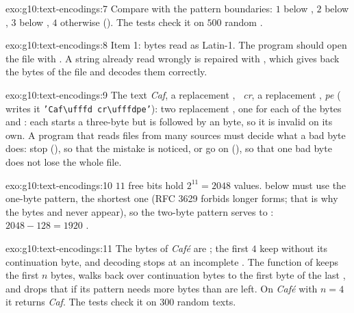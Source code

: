 \begin{solution}{exo:g10:text-encodings:7}
Compare with the pattern boundaries: $1$ below , $2$ below , $3$ below , $4$
otherwise (). The tests check it on $500$ random .
\end{solution}

\begin{solution}{exo:g10:text-encodings:8}
Item 1:  bytes read as Latin-1. The program should open the file with . A string already
read wrongly is repaired with , which gives back the bytes of the file and
decodes them correctly.
\end{solution}

\begin{solution}{exo:g10:text-encodings:9}
The text \textit{Caf}, a replacement , \textit{~cr}, a replacement , \textit{pe} (
writes it \texttt{'Caf\textbackslash ufffd cr\textbackslash ufffdpe'}): two replacement  , one for
each of the bytes  and : each starts a three-byte   but is followed by an  byte,
so it is invalid on its own. A program that reads files from many sources must decide what a bad byte does: stop
(), so that the mistake is noticed, or go on (), so that one bad byte does not lose the
whole file.
\end{solution}

\begin{solution}{exo:g10:text-encodings:10}
$11$ free bits hold $2^{11} = 2048$ values.  below  must use the one-byte pattern, the
shortest one (RFC 3629 forbids longer forms; that is why the bytes  and  never appear), so the
two-byte pattern serves  to : $2048 - 128 = 1920$ .
\end{solution}

\begin{solution}{exo:g10:text-encodings:11}
The  bytes of \textit{Café} are ; the first $4$ keep  without its continuation
byte, and decoding stops at an incomplete . The function  of  keeps the
first $n$ bytes, walks back over continuation bytes to the first byte of the last , and drops that 
if its pattern needs more bytes than are left. On \textit{Café} with $n = 4$ it returns \textit{Caf}. The tests check
it on $300$ random texts.
\end{solution}

